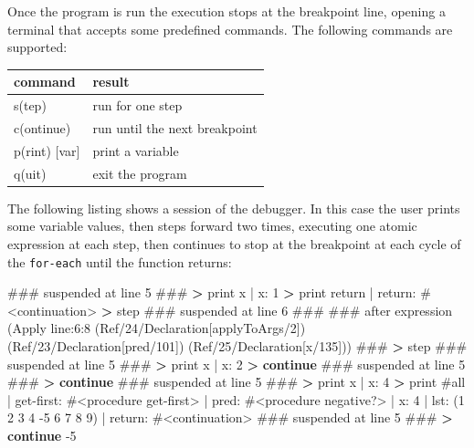 \documentclass[12pt,a4paper,oneside,openright]{book}
\newenvironment{Shaded}{\begin{snugshade}}{\end{snugshade}}
\newcommand{\KeywordTok}[1]{\textcolor[rgb]{0.13,0.29,0.53}{\textbf{{#1}}}}
\newcommand{\DecValTok}[1]{\textcolor[rgb]{0.00,0.00,0.81}{{#1}}}
\newcommand{\NormalTok}[1]{{#1}}
\begin{document}
Once the program is run the execution stops at the breakpoint line,
opening a terminal that accepts some predefined commands. The following
commands are supported:

\begin{longtable}[c]{@{}ll@{}}
\toprule
command & result\tabularnewline
\midrule
\endhead
s(tep) & run for one step\tabularnewline
c(ontinue) & run until the next breakpoint\tabularnewline
p(rint) {[}var{]} & print a variable\tabularnewline
q(uit) & exit the program\tabularnewline
\bottomrule
\end{longtable}

The following listing shows a session of the debugger. In this case the
user prints some variable values, then steps forward two times,
executing one atomic expression at each step, then continues to stop at
the breakpoint at each cycle of the \texttt{for-each} until the function
returns:

\begin{Shaded}
\begin{Highlighting}[]
    \NormalTok{### suspended at line }\DecValTok{5} \NormalTok{###}
    \KeywordTok{>} \NormalTok{print x}
    \NormalTok{| x: }\DecValTok{1}
    \KeywordTok{>} \NormalTok{print return}
    \NormalTok{| return: #<continuation>}
    \KeywordTok{>} \NormalTok{step}
    \NormalTok{### suspended at line }\DecValTok{6} \NormalTok{###}
    \NormalTok{### after expression}
    \NormalTok{(Apply line:}\DecValTok{6}\NormalTok{:}\DecValTok{8} \NormalTok{(Ref/}\DecValTok{24}\NormalTok{/Declaration[applyToArgs/}\DecValTok{2}\NormalTok{])}
      \NormalTok{(Ref/}\DecValTok{23}\NormalTok{/Declaration[pred/}\DecValTok{101}\NormalTok{])}
      \NormalTok{(Ref/}\DecValTok{25}\NormalTok{/Declaration[x/}\DecValTok{135}\NormalTok{]))}
    \NormalTok{###}
    \KeywordTok{>} \NormalTok{step}
    \NormalTok{### suspended at line }\DecValTok{5} \NormalTok{###}
    \KeywordTok{>} \NormalTok{print x}
    \NormalTok{| x: }\DecValTok{2}
    \KeywordTok{>} \KeywordTok{continue}
    \NormalTok{### suspended at line }\DecValTok{5} \NormalTok{###}
    \KeywordTok{>} \KeywordTok{continue}
    \NormalTok{### suspended at line }\DecValTok{5} \NormalTok{###}
    \KeywordTok{>} \NormalTok{print x}
    \NormalTok{| x: }\DecValTok{4}
    \KeywordTok{>} \NormalTok{print #all}
    \NormalTok{| get-first: #<procedure get-first>}
    \NormalTok{| pred: #<procedure negative?>}
    \NormalTok{| x: }\DecValTok{4}
    \NormalTok{| lst: (}\DecValTok{1} \DecValTok{2} \DecValTok{3} \DecValTok{4} \NormalTok{-}\DecValTok{5} \DecValTok{6} \DecValTok{7} \DecValTok{8} \DecValTok{9}\NormalTok{)}
    \NormalTok{| return: #<continuation>}
    \NormalTok{### suspended at line }\DecValTok{5} \NormalTok{###}
    \KeywordTok{>} \KeywordTok{continue}
    \NormalTok{-}\DecValTok{5}
\end{Highlighting}
\end{Shaded}
\end{document}
